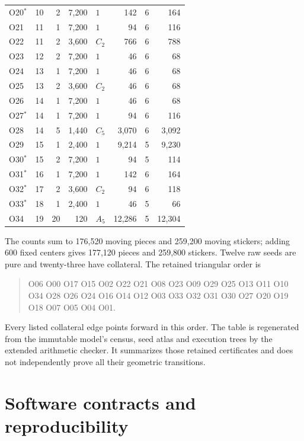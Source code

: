 \documentclass[a4paper,11pt]{article}
\begin{document}
\begin{longtable}{@{}lrrrlrrr@{}}
O20\(^{*}\) & 10 & 2 & 7,200 & \(1\) & 142 & 6 & 164 \\
O21 & 11 & 1 & 7,200 & \(1\) & 94 & 6 & 116 \\
O22 & 11 & 2 & 3,600 & \(C_{2}\) & 766 & 6 & 788 \\
O23 & 12 & 2 & 7,200 & \(1\) & 46 & 6 & 68 \\
O24 & 13 & 1 & 7,200 & \(1\) & 46 & 6 & 68 \\
O25 & 13 & 2 & 3,600 & \(C_{2}\) & 46 & 6 & 68 \\
O26 & 14 & 1 & 7,200 & \(1\) & 46 & 6 & 68 \\
O27\(^{*}\) & 14 & 1 & 7,200 & \(1\) & 94 & 6 & 116 \\
O28 & 14 & 5 & 1,440 & \(C_{5}\) & 3,070 & 6 & 3,092 \\
O29 & 15 & 1 & 2,400 & \(1\) & 9,214 & 5 & 9,230 \\
O30\(^{*}\) & 15 & 2 & 7,200 & \(1\) & 94 & 5 & 114 \\
O31\(^{*}\) & 16 & 1 & 7,200 & \(1\) & 142 & 6 & 164 \\
O32\(^{*}\) & 17 & 2 & 3,600 & \(C_{2}\) & 94 & 6 & 118 \\
O33\(^{*}\) & 18 & 1 & 2,400 & \(1\) & 46 & 5 & 66 \\
O34 & 19 & 20 & 120 & \(A_{5}\) & 12,286 & 5 & 12,304 \\
\end{longtable}\endgroup

\begin{samepage}
The counts sum to 176,520 moving pieces and 259,200 moving stickers; adding 600 fixed centers gives 177,120 pieces and 259,800 stickers. Twelve raw seeds are pure and twenty-three have collateral. The retained triangular order is
\begin{quote}\small\ttfamily\raggedright
O06 O00 O17 O15 O02 O22 O21 O08 O23 O09 O29 O25 O13 O11 O10 O34 O28 O26 O24 O16 O14 O12 O03 O33 O32 O31 O30 O27 O20 O19 O18 O07 O05 O04 O01.
\end{quote}
\end{samepage}
Every listed collateral edge points forward in this order. The table is regenerated from the immutable model's census, seed atlas and execution trees by the extended arithmetic checker. It summarizes those retained certificates and does not independently prove all their geometric transitions.

\section{Software contracts and reproducibility}
\label{app:contracts}
\end{document}
